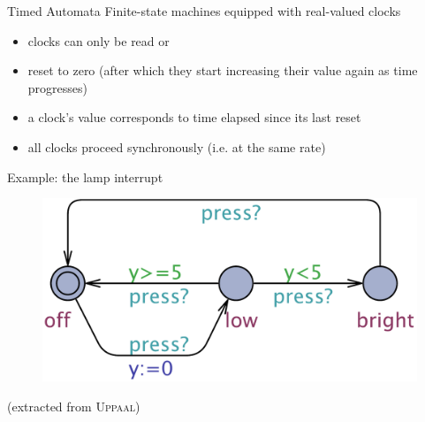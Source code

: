 \documentclass{beamer}
\def\uppaal{\textsc{Uppaal}}
\begin{document}
\begin{slide}{Timed Automata}
Finite-state machines equipped with \alert{real-valued clocks}

\begin{itemize}
\item clocks can only be read or
\item reset to zero (after which they start increasing their value again as time progresses)
\item a clock's value corresponds to time elapsed since its last reset 
\item all clocks proceed synchronously (i.e. at the same rate)
\end{itemize}
\end{slide}

\begin{frame}{Example: the lamp interrupt}
  
\begin{figure}[htb]
  \centering
  \includegraphics[scale=0.35]{./images/Lamp.pdf}\\
\end{figure}

\centering
{\scriptsize (extracted from \uppaal)}

\end{frame}
\end{document}
